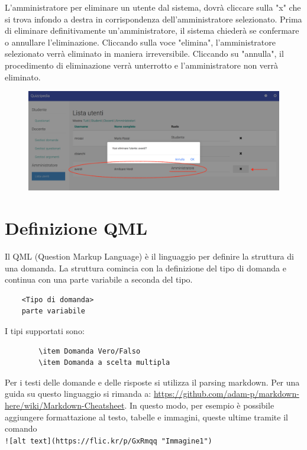 \documentclass[12pt,a4paper]{article}
\begin{document}
	L'amministratore per eliminare un utente dal sistema, dovrà cliccare sulla "x" che si trova infondo a destra  in corrispondenza dell'amministratore selezionato. Prima di eliminare definitivamente un'amministratore, il sistema chiederà se confermare o annullare l'eliminazione. Cliccando sulla voce "elimina", l'amministratore selezionato verrà eliminato in maniera irreversibile. Cliccando su "annulla", il procedimento di eliminazione verrà unterrotto e l'amministratore non verrà eliminato.
	
		\begin{figure}[H]
			\centering
			\includegraphics[width=1\linewidth]{../img/screenshot/rimozioneAmministratore.png}
			\caption{}
			\label{Rimozione di un amministratore dal sistema}
		\end{figure}
	
	\section{Definizione QML}
	Il QML (Question Markup Language) è il linguaggio per definire la struttura di una domanda. La struttura comincia con la definizione del tipo di domanda e continua con una parte variabile a seconda del tipo.\\
	\begin{verbatim}
	<Tipo di domanda>
	parte variabile
	\end{verbatim}
		
	 I tipi supportati sono:
	\begin{verbatim}
		\item Domanda Vero/Falso
		\item Domanda a scelta multipla
	\end{verbatim}
	Per i testi delle domande e delle risposte si utilizza il parsing markdown. Per una guida su questo linguaggio si rimanda a: \url{https://github.com/adam-p/markdown-here/wiki/Markdown-Cheatsheet}. In questo modo, per esempio è possibile aggiungere formattazione al testo, tabelle e immagini, queste ultime tramite il comando\\
	 \texttt{![alt text](https://flic.kr/p/GxRmqq "Immagine1")}\\
		
\end{document}
